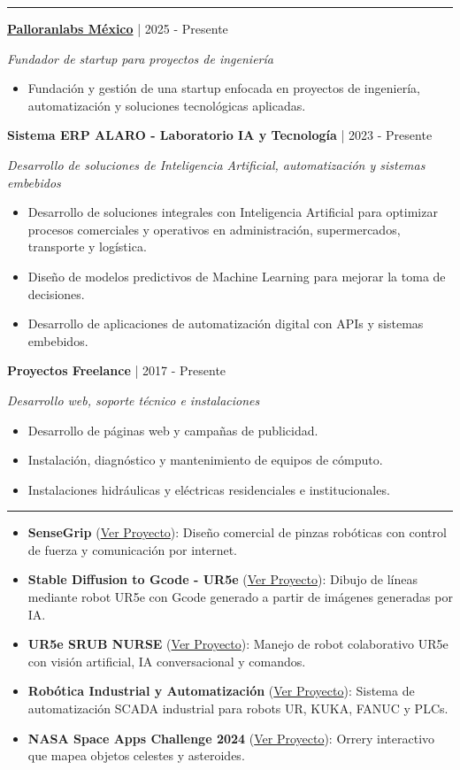 \documentclass[10pt,letterpaper]{article}
\newcommand{\sectionline}{\vspace{-2pt}\textcolor{accent}{\rule{\linewidth}{0.8pt}}\vspace{1pt}}
\newcommand{\cvsection}[1]{\vspace{5pt}{\large\bfseries\textcolor{navy}{#1}}\par\sectionline}
\newcommand{\entry}[3]{\textbf{#1} \textcolor{muted}{| #2}\par\textit{#3}\par}
\newcommand{\projectlink}[1]{\href{#1}{Ver Proyecto}}
\begin{document}
\cvsection{Experiencia profesional}
\entry{\href{https://www.palloranlabs.com/}{Palloranlabs M\'{e}xico}}{2025 - Presente}{Fundador de startup para proyectos de ingenier\'{i}a}
\begin{itemize}
  \item Fundaci\'{o}n y gesti\'{o}n de una startup enfocada en proyectos de ingenier\'{i}a, automatizaci\'{o}n y soluciones tecnol\'{o}gicas aplicadas.
\end{itemize}

\entry{Sistema ERP ALARO - Laboratorio IA y Tecnolog\'{i}a}{2023 - Presente}{Desarrollo de soluciones de Inteligencia Artificial, automatizaci\'{o}n y sistemas embebidos}
\begin{itemize}
  \item Desarrollo de soluciones integrales con Inteligencia Artificial para optimizar procesos comerciales y operativos en administraci\'{o}n, supermercados, transporte y log\'{i}stica.
  \item Dise\~{n}o de modelos predictivos de Machine Learning para mejorar la toma de decisiones.
  \item Desarrollo de aplicaciones de automatizaci\'{o}n digital con APIs y sistemas embebidos.
\end{itemize}

\entry{Proyectos Freelance}{2017 - Presente}{Desarrollo web, soporte t\'{e}cnico e instalaciones}
\begin{itemize}
  \item Desarrollo de p\'{a}ginas web y campa\~{n}as de publicidad.
  \item Instalaci\'{o}n, diagn\'{o}stico y mantenimiento de equipos de c\'{o}mputo.
  \item Instalaciones hidr\'{a}ulicas y el\'{e}ctricas residenciales e institucionales.
\end{itemize}

\cvsection{Proyectos acad\'{e}micos destacados}
\begin{itemize}
  \item \textbf{\textmu{}SenseGrip} (\projectlink{https://jphajp.github.io/JPHAJP/\#proyectos}): Dise\~{n}o comercial de pinzas rob\'{o}ticas con control de fuerza y comunicaci\'{o}n por internet.
  \item \textbf{Stable Diffusion to Gcode - UR5e} (\projectlink{https://github.com/JPHAJP/StableDiffusion_t_gcode}): Dibujo de l\'{i}neas mediante robot UR5e con Gcode generado a partir de im\'{a}genes generadas por IA.
  \item \textbf{UR5e SRUB NURSE} (\projectlink{https://jphajp.github.io/UR5_SRUB_NURSE/}): Manejo de robot colaborativo UR5e con visi\'{o}n artificial, IA conversacional y comandos.
  \item \textbf{Rob\'{o}tica Industrial y Automatizaci\'{o}n} (\projectlink{https://jphajp.github.io/JPHAJP/Web/projects/4\%20-\%20PLC/All\%20SCADA.pdf}): Sistema de automatizaci\'{o}n SCADA industrial para robots UR, KUKA, FANUC y PLCs.
  \item \textbf{NASA Space Apps Challenge 2024} (\projectlink{https://jphajp.github.io/JPHAJP/Web/projects/1\%20-\%20Nasa/template_project.html}): Orrery interactivo que mapea objetos celestes y asteroides.
\end{itemize}
\end{document}
